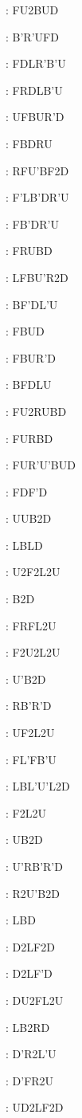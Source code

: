 \documentclass[9pt]{article}
\begin{document}
{\begin{multicols}{6}
: FU2BUD

: B'R'UFD

: FDLR'B'U

: FRDLB'U

: UFBUR'D

: FBDRU

: RFU'BF2D

: F'LB'DR'U

: FB'DR'U

: FRUBD

: LFBU'R2D

: BF'DL'U

: FBUD

: FBUR'D

: BFDLU

: FU2RUBD

: FURBD

: FUR'U'BUD

: FDF'D

: UUB2D

: LBLD

: U2F2L2U

: B2D

: FRFL2U

: F2U2L2U

: U'B2D

: RB'R'D

: UF2L2U

: FL'FB'U

: LBL'U'L2D

: F2L2U

: UB2D

: U'RB'R'D

: R2U'B2D

: LBD

: D2LF2D

: D2LF'D

: DU2FL2U

: LB2RD

: D'R2L'U

: D'FR2U

: UD2LF2D


\end{multicols}}
\end{document}
